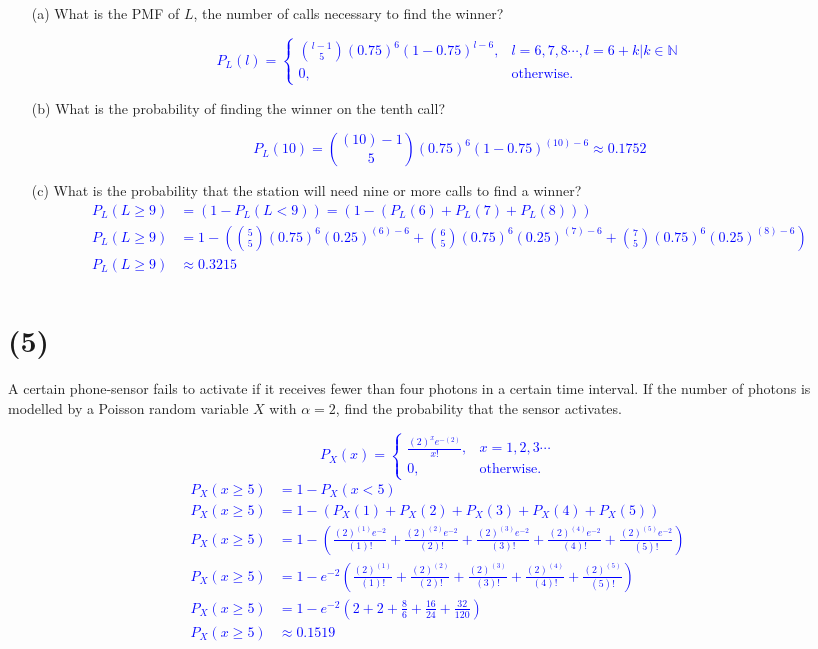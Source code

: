 \documentclass[12pt]{article}
\begin{document}
\begin{enumerate}
    \item[(a)] What is the PMF of $L$, the number of calls necessary to find the winner?
    \item[] \textcolor{blue}{\[
P_L(l) =
\begin{cases}
\binom{l-1}{5}(0.75)^6(1-0.75)^{l-6}, & l = 6,7,8 \cdots, l=6+k | k\in \mathbb{N} \\
0, & \text{otherwise}.
\end{cases}
\]}
    \item[(b)] What is the probability of finding the winner on the tenth call?
    \item[] \textcolor{blue}{\[P_L(10) = \binom{(10)-1}{5}(0.75)^6(1-0.75)^{(10)-6} \approx 0.1752\]}
    \item[(c)] What is the probability that the station will need nine or more calls to find a winner?
    \textcolor{blue}{\[
    \begin{aligned}
    P_L(L\geq 9) &= (1-P_L(L < 9)) = (1-(P_L(6)+P_L(7)+P_L(8)))\\
    P_L(L\geq 9) &= 1-\left(\binom{5}{5}(0.75)^6(0.25)^{(6)-6}+\binom{6}{5}(0.75)^6(0.25)^{(7)-6}+\binom{7}{5}(0.75)^6(0.25)^{(8)-6}\right)\\
    P_L(L\geq 9) & \approx 0.3215\\
    \end{aligned}\]}
\end{enumerate}

\section*{(5)}
A certain phone-sensor fails to activate if it receives fewer than four photons in a
certain time interval. If the number of photons is modelled by a Poisson random variable
$X$ with $\alpha = 2$, find the probability that the sensor activates.

\textcolor{blue}{\[
P_X(x) =
\begin{cases}
\frac{(2)^x e^{-(2)}}{x!}, & x = 1,2,3 \cdots \\
0, & \text{otherwise}.
\end{cases}
\]
\[
\begin{aligned}
P_X(x\geq 5)&= 1 - P_X(x < 5)\\
P_X(x\geq 5)&= 1- \left(P_X(1)+P_X(2)+P_X(3)+P_X(4)+P_X(5)\right)\\
P_X(x\geq 5)&=  1- \left(\frac{(2)^{(1)} e^{-2}}{(1)!}+\frac{(2)^{(2)} e^{-2}}{(2)!}+\frac{(2)^{(3)} e^{-2}}{(3)!}+\frac{(2)^{(4)} e^{-2}}{(4)!}+\frac{(2)^{(5)} e^{-2}}{(5)!}\right)\\
P_X(x\geq 5)&=  1- e^{-2}\left(\frac{(2)^{(1)}}{(1)!}+\frac{(2)^{(2)} }{(2)!}+\frac{(2)^{(3)} }{(3)!}+\frac{(2)^{(4)} }{(4)!}+\frac{(2)^{(5)}}{(5)!}\right)\\
P_X(x\geq 5)&=  1- e^{-2}\left(2+2+\frac{8}{6}+\frac{16}{24}+\frac{32}{120}\right)\\
P_X(x\geq 5)&\approx 0.1519  \\
\end{aligned}
\]
}
\end{document}

